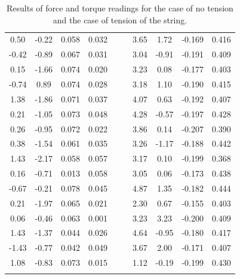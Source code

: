 \begin{longtable}{|c|c|c|c|rr|c|c|c|c|}
		0.50  & -0.22 & 0.058 & 0.032 &       &       & 3.65  & 1.72  & -0.169 & 0.416 \\
		-0.42 & -0.89 & 0.067 & 0.031 &       &       & 3.04  & -0.91 & -0.191 & 0.409 \\
		0.15  & -1.66 & 0.074 & 0.020 &       &       & 3.23  & 0.08  & -0.177 & 0.403 \\
		-0.74 & 0.89  & 0.074 & 0.028 &       &       & 3.18  & 1.10  & -0.190 & 0.415 \\
		1.38  & -1.86 & 0.071 & 0.037 &       &       & 4.07  & 0.63  & -0.192 & 0.407 \\
		0.21  & -1.05 & 0.073 & 0.048 &       &       & 4.28  & -0.57 & -0.197 & 0.428 \\
		0.26  & -0.95 & 0.072 & 0.022 &       &       & 3.86  & 0.14  & -0.207 & 0.390 \\
		0.38  & -1.54 & 0.061 & 0.035 &       &       & 3.26  & -1.17 & -0.188 & 0.442 \\
		1.43  & -2.17 & 0.058 & 0.057 &       &       & 3.17  & 0.10  & -0.199 & 0.368 \\
		0.16  & -0.71 & 0.013 & 0.058 &       &       & 3.05  & 0.06  & -0.173 & 0.438 \\
		-0.67 & -0.21 & 0.078 & 0.045 &       &       & 4.87  & 1.35  & -0.182 & 0.444 \\
		0.21  & -1.97 & 0.065 & 0.021 &       &       & 2.30  & 0.67  & -0.155 & 0.403 \\
		0.06  & -0.46 & 0.063 & 0.001 &       &       & 3.23  & 3.23  & -0.200 & 0.409 \\
		1.43  & -1.37 & 0.044 & 0.026 &       &       & 4.64  & -0.95 & -0.180 & 0.417 \\
		-1.43 & -0.77 & 0.042 & 0.049 &       &       & 3.67  & 2.00  & -0.171 & 0.407 \\
		1.08  & -0.83 & 0.073 & 0.015 &       &       & 1.12  & -0.19 & -0.199 & 0.430 \\
		\cmidrule{1-4}\cmidrule{7-10}    %
	\caption{Results of force and torque readings for the case of no tension and the case of tension of the string.}
	\label{tab:readings}%
\end{longtable}%

